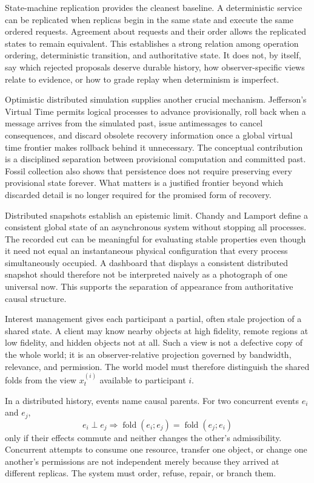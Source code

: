 \documentclass[11pt]{article}
\newcommand{\Fold}{\operatorname{fold}}
\begin{document}
State-machine replication provides the cleanest baseline. A deterministic service can be replicated when replicas begin in the same state and execute the same ordered requests. Agreement about requests and their order allows the replicated states to remain equivalent. This establishes a strong relation among operation ordering, deterministic transition, and authoritative state. It does not, by itself, say which rejected proposals deserve durable history, how observer-specific views relate to evidence, or how to grade replay when determinism is imperfect.

Optimistic distributed simulation supplies another crucial mechanism. Jefferson's Virtual Time permits logical processes to advance provisionally, roll back when a message arrives from the simulated past, issue antimessages to cancel consequences, and discard obsolete recovery information once a global virtual time frontier makes rollback behind it unnecessary. The conceptual contribution is a disciplined separation between provisional computation and committed past. Fossil collection also shows that persistence does not require preserving every provisional state forever. What matters is a justified frontier beyond which discarded detail is no longer required for the promised form of recovery.

Distributed snapshots establish an epistemic limit. Chandy and Lamport define a consistent global state of an asynchronous system without stopping all processes. The recorded cut can be meaningful for evaluating stable properties even though it need not equal an instantaneous physical configuration that every process simultaneously occupied. A dashboard that displays a consistent distributed snapshot should therefore not be interpreted naively as a photograph of one universal now. This supports the separation of appearance from authoritative causal structure.

Interest management gives each participant a partial, often stale projection of a shared state. A client may know nearby objects at high fidelity, remote regions at low fidelity, and hidden objects not at all. Such a view is not a defective copy of the whole world; it is an observer-relative projection governed by bandwidth, relevance, and permission. The world model must therefore distinguish the shared folds from the view $x_t^{(i)}$ available to participant $i$.

In a distributed history, events name causal parents. For two concurrent events $e_i$ and $e_j$,
\[
e_i\perp e_j \Longrightarrow \Fold(e_i; e_j)=\Fold(e_j; e_i)
\]
only if their effects commute and neither changes the other's admissibility. Concurrent attempts to consume one resource, transfer one object, or change one another's permissions are not independent merely because they arrived at different replicas. The system must order, refuse, repair, or branch them.
\end{document}
